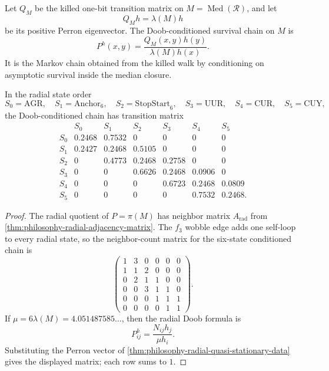 \begin{definition}
\label{def:philosophy-doob-conditioned-survival-dynamics}
Let $Q_{M}$ be the killed one-bit transition matrix on
$M=\operatorname{Med}(\mathcal R)$, and let
$$
  Q_{M}h=\lambda(M)h
$$
be its positive Perron eigenvector. The Doob-conditioned survival chain
on $M$ is
$$
  P^{h}(x,y)=
  \frac{Q_{M}(x,y)h(y)}{\lambda(M)h(x)}.
$$
It is the Markov chain obtained from the killed walk by conditioning on
asymptotic survival inside the median closure.
\end{definition}

\begin{theorem}
\label{thm:philosophy-six-state-doob-transition-matrix}
In the radial state order
$$
  S_{0}=\mathrm{AGR},\quad
  S_{1}=\mathrm{Anchor}_{6},\quad
  S_{2}=\mathrm{StopStart}_{6},\quad
  S_{3}=\mathrm{UUR},\quad
  S_{4}=\mathrm{CUR},\quad
  S_{5}=\mathrm{CUY},
$$
the Doob-conditioned chain has transition matrix
$$
\begin{array}{c|rrrrrr}
  & S_{0}&S_{1}&S_{2}&S_{3}&S_{4}&S_{5}\\
  \hline
  S_{0} & 0.2468&0.7532&0&0&0&0\\
  S_{1} & 0.2427&0.2468&0.5105&0&0&0\\
  S_{2} & 0&0.4773&0.2468&0.2758&0&0\\
  S_{3} & 0&0&0.6626&0.2468&0.0906&0\\
  S_{4} & 0&0&0&0.6723&0.2468&0.0809\\
  S_{5} & 0&0&0&0&0.7532&0.2468.
\end{array}
$$
\end{theorem}
\begin{proof}
The radial quotient of $P=\pi(M)$ has neighbor matrix
$A_{\mathrm{rad}}$ from
\autoref{thm:philosophy-radial-adjacency-matrix}. The $f_{3}$ wobble
edge adds one self-loop to every radial state, so the neighbor-count
matrix for the six-state conditioned chain is
$$
\begin{pmatrix}
  1&3&0&0&0&0\\
  1&1&2&0&0&0\\
  0&2&1&1&0&0\\
  0&0&3&1&1&0\\
  0&0&0&1&1&1\\
  0&0&0&0&1&1
\end{pmatrix}.
$$
If $\mu=6\lambda(M)=4.051487585\ldots$, then the radial Doob formula is
$$
  P^{h}_{ij}=\frac{N_{ij}h_{j}}{\mu h_{i}}.
$$
Substituting the Perron vector of
\autoref{thm:philosophy-radial-quasi-stationary-data} gives the
displayed matrix; each row sums to $1$.
\end{proof}

